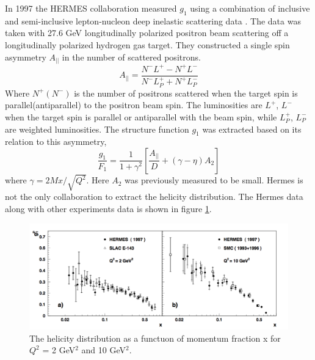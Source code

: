 \documentclass[abstract = on,listof=totoc, bibliography=totoc]{scrreprt}
\begin{document}
In 1997 the HERMES collaboration measured $g_1$ using a combination of inclusive and semi-inclusive lepton-nucleon deep inelastic scattering data \cite{hermesHel}. The data was taken with 27.6 GeV longitudinally polarized positron beam scattering off a longitudinally polarized hydrogen gas target. They constructed a single spin asymmetry $A_{||}$ in the number of scattered positrons. 
\begin{equation}
A_{||} = \frac{N^-L^+ - N^+L^-}{N^-L_P^+ + N^+L_P^-} 
\end{equation}
Where $N^+(N^-)$ is the number of positrons scattered when the target spin is parallel(antiparallel) to the positron beam spin. The luminosities are $L^+$, $L^-$ when the target spin is parallel or antiparallel with the beam spin, while $L^+_P$, $L^-_P$ are weighted luminosities. The structure function $g_1$ was extracted based on its relation to this asymmetry,
\begin{equation}
\frac{g_1}{F_1} = \frac{1}{1+\gamma^2}\left[\frac{A_{||}}{D} + (\gamma - \eta)A_2\right]
\end{equation}
where $\gamma = 2Mx/\sqrt{Q^2}$. Here $A_2$ was previously measured to be small\cite{hermesHel}\cite{strucFuncsg1g2}.
Hermes is not the only collaboration to extract the helicity distribution. The Hermes data along with other experiments data is shown in figure \ref{fig:helicityDist}. 
 \begin{figure}
\begin{center}
\includegraphics[width = 1\textwidth]{helicityDistFromHermes}
\caption[HERMES results for helicity distribution function]{The helicity distribution as a functuon of momentum fraction x for $Q^2$ = 2 GeV$^2$ and 10 GeV$^2$.}
\label{fig:helicityDist}
\end{center}
\end{figure}
\end{document}
